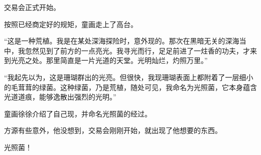 \begin{this_body}
交易会正式开始。

按照已经商定好的规矩，童画走上了高台。

“这是一种荒植。我是在某处深海探险时，意外现的。那次在黑暗无关的深海当中，我忽然见到了前方的一点亮光。我寻光而行，足足前进了一炷香的功夫，才来到光亮之处。那里简直是一片光道的天堂。光明灿烂，灼照万里。”

“我起先以为，这是珊瑚群出的光亮。但很快，我现珊瑚表面上都附着了一层细小的毛茸茸的绿菌。这种绿菌，乃是荒植，随处可见，我命名为光照菌，它本身蕴含光道道痕，能够逸散出强烈的光明。”

童画徐徐介绍了自己现，并命名光照菌的经过。

方源有些意外，他没想到，交易会刚刚开始，就出现了他想要的东西。

光照菌！

\end{this_body}

